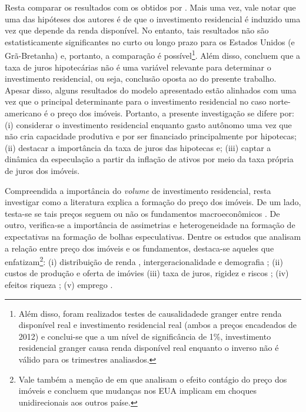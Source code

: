 Resta comparar os resultados com os obtidos por \textcite{arestis_residential_2015}. Mais uma vez, vale notar que uma das hipóteses dos autores é de que o investimento residencial é induzido uma vez que depende da renda disponível. No entanto, tais resultados não são estatisticamente significantes no curto ou longo prazo para os Estados Unidos (e Grã-Bretanha) e, portanto, a comparação é possível\footnote{Além disso, foram realizados testes de causalidadede granger entre renda disponível real e investimento residencial real (ambos a preços encadeados de 2012) e conclui-se que a um nível de significância de 1\%, investimento residencial granger causa renda disponível real enquanto o inverso não é válido para os trimestres analiasdos.}. Além disso, concluem que a taxa de juros hipotecárias não é uma variável relevante para determinar o investimento residencial, ou seja, conclusão oposta ao do presente trabalho. Apesar disso, alguns resultados do modelo apresentado estão alinhados com \textcite{arestis_residential_2015} uma vez que o principal determinante para o investimento residencial no caso norte-americano é o preço dos imóveis. Portanto, a presente investigação se difere por: (i) considerar o investimento residencial enquanto gasto autônomo uma vez que não cria capacidade produtiva e por ser financiado principalmente por hipotecas; (ii) destacar a importância da taxa de juros das hipotecas e; (iii) captar a dinâmica da especulação a partir da inflação de ativos por meio da taxa própria de juros dos imóveis.



Compreendida a importância do \textit{volume} de investimento residencial, resta investigar como a literatura explica a formação do preço dos imóveis.
De um lado, testa-se se tais preços seguem ou não os fundamentos macroeconômicos \cites{holly_house_1997}{andrews_real_2010}. 
De outro, verifica-se a importância de assimetrias e heterogeneidade na formação de expectativas na formação de bolhas especulativas. Dentre os estudos que analisam a relação entre preço dos imóveis e os fundamentos, destaca-se aqueles que enfatizam\footnote{Vale também a menção de \textcite{de_bandt_international_2010} em que analisam o efeito contágio do preço dos imóveis e concluem que mudanças nos EUA implicam em choques unidirecionais aos outros paíse.}:
(i) distribuição de renda \cites{green_economic_2014}{ozmen_impact_2019}, intergeracionalidade e demografia  \cites{campbell_long_1963}{fleming_review_1966}; 
(ii) custos de produção e oferta de imóvies \cites{ayuso_house_2006}{glaeser_housing_2008}{krakstad_long-run_2015} 
(iii) taxa de juros, rigidez e riscos \cites{li_cyclical_2004}{miller_impact_2005}{li_house_2018}; 
(iv) efeitos riqueza \cites{case_comparing_2001}{vadas_modelling_2004}{chauvin_wealth_2010}{bassanetti_effects_2010}{arrondel_housing_2010}{sastre_assessment_2010}{fleischmann_real_2019}; 
(v) emprego \cites{miller_impact_2005}{pan_long-run_2016}{liu_land_2013}. 

